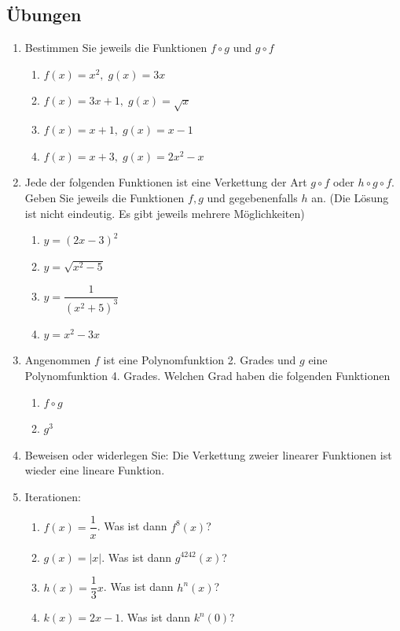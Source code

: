 \subsection{Übungen}
\begin{enumerate}
    \item Bestimmen Sie jeweils die Funktionen $f \circ g$ und $g \circ f$
          \begin{enumerate}
              \item $f(x) = x^2, \; g(x) = 3x$
              \item $f(x) = 3x+1, \; g(x) = \sqrt{x}$
              \item $f(x) = x+1, \; g(x) = x-1$
              \item $f(x) = x+3, \; g(x) = 2x^2 - x$
          \end{enumerate}

    \item Jede der folgenden Funktionen ist eine Verkettung der Art $g \circ f$ oder $h \circ g \circ f$. Geben Sie jeweils die Funktionen $f, g$ und gegebenenfalls $h$ an. (Die Lösung ist nicht eindeutig. Es gibt jeweils mehrere Möglichkeiten)
          \begin{enumerate}
              \item $y = (2x-3)^2$
              \item $y = \sqrt{x^2 - 5}$
              \item $y = \dfrac{1}{(x^2+5)^3}$
              \item $y = x^2 - 3x$
          \end{enumerate}

    \item Angenommen $f$ ist eine Polynomfunktion 2. Grades und $g$ eine Polynomfunktion 4. Grades. Welchen Grad haben die folgenden Funktionen
          \begin{enumerate}
              \item $f \circ g$
              \item $g^3$
          \end{enumerate}

    \item Beweisen oder widerlegen Sie: Die Verkettung zweier linearer Funktionen ist wieder eine lineare Funktion.

    \item Iterationen:
          \begin{enumerate}
              \item $f(x) = \dfrac{1}{x}$. Was ist dann $f^8(x)$?
              \item $g(x) = |x|$. Was ist dann $g^{4242}(x)$?
              \item $h(x) = \dfrac{1}{3}x$. Was ist dann $h^n(x)$?
              \item $k(x) = 2x-1$. Was ist dann $k^n(0)$?
          \end{enumerate}
\end{enumerate}
\newpage


